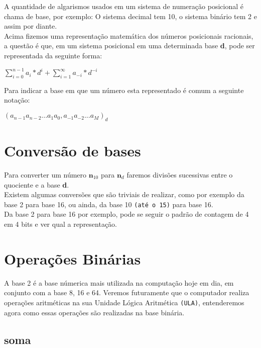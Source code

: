\documentclass[12pt, onecolumn]{article}
\begin{document}
	A quantidade de algarismos usados em um sistema de numeração posicional é
	chama de base, por exemplo: O sistema decimal tem 10, o sistema binário tem 2 e 
	assim por diante.\\
	\newline
	Acima fizemos uma representação matemática dos números posicionais 
	racionais, a questão é que, em um sistema posicional em uma determinada
	base \textbf{d}, pode ser representada da seguinte forma: 

	\begin{center}
		$\sum_{i=0}^{n-1} a_{i} * d^{i} + 
		\sum_{i=1}^{\infty} a_{-i} * d^{-i}$
	\end{center}

	Para indicar a base em que um número esta representado é comum a 
	seguinte notação:

	\begin{center}
		$(a_{n-1} a_{n-2} ... a_{1} a_{0}, a_{-1} a_{-2} ... a_{M})_d$
	\end{center}

			\section{\centering Conversão de bases}

	Para converter um número $\textbf{n}_{10}$ para $\textbf{n}_{d}$ faremos
	divisões sucessivas entre o quociente e a base \textbf{d}.\\
	\newline
	Existem algumas conversões que são triviais de realizar, como por exemplo
	da base 2 para base 16, ou ainda, da base 10 \texttt{(até o 15)} 
	para base 16.\\
	\newline
	Da base 2 para base 16 por exemplo, pode se seguir o padrão de contagem 
	de 4 em 4 bits e ver qual a representação.
	
			\section{\centering Operações Binárias}

	A base 2 é a base númerica mais utilizada na computação hoje em dia, em conjunto
	com a base 8, 16 e 64. Veremos futuramente que o computador realiza operações
	aritméticas na sua Unidade Lógica Aritmética \texttt{(ULA)}, entenderemos
	agora como essas operações são realizadas na base binária.

			\subsection{\centering soma}
\end{document}
